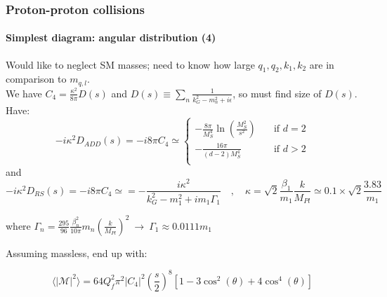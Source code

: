 \documentclass[10pt]{beamer}
\begin{document}
	\begin{frame}
		\frametitle{Proton-proton collisions}
		\framesubtitle{Simplest diagram: angular distribution (4)}
		Would like to neglect SM masses; need to know how large $q_1,q_2,k_1,k_2$ are in comparison to $m_{q,l}$.\\
		We have $C_4 = \frac{\kappa^2}{8\pi} D(s)$ and $D(s) \equiv \sum_{n} \frac{1}{k_G^2 - m_n^2 + i\epsilon}$, so must find size of $D(s)$.\\
		
		Have:
		\tiny
		\begin{equation}
		-i\kappa^2D_{ADD}(s) = -i8\pi C_4\simeq
		\begin{cases}
		-\frac{8\pi}{M_S^4}\ln\left(\frac{M_S^2}{s^2}\right)       & \quad \text{if } d=2\\
		-\frac{16\pi}{(d-2)M_S^4}  & \quad \text{if } d>2\\
		\end{cases}
		\end{equation}
		\normalsize
		and 
		\tiny
		\begin{equation}
		-i\kappa^2D_{RS}(s) = -i8\pi C_4\simeq = -\frac{i\kappa^2}{k_G^2 - m_1^2 + im_1 \Gamma_1}\quad,\quad \kappa = \sqrt{2}\frac{\beta_1}{m_1}\frac{k}{M_{Pl}} \simeq 0.1\times\sqrt{2}\frac{3.83}{m_1}
		\end{equation}
		\normalsize
		
		where $\Gamma_n = \frac{295}{96}\frac{\beta_n^2}{10\pi}m_n\left(\frac{k}{M_{Pl}}\right)^2 \:\rightarrow\: \Gamma_1 \approx 0.0111m_1$
		
		Assuming massless, end up with:
		
		\begin{equation}
			\langle|\mathcal{M}|^2\rangle = 64Q_f^2\pi^2|C_4|^2 \left(\frac{s}{2}\right)^8\left[1-3\cos^2(\theta) + 4\cos^4(\theta)\right]
		\end{equation}
		
	\end{frame}
	
\end{document}
